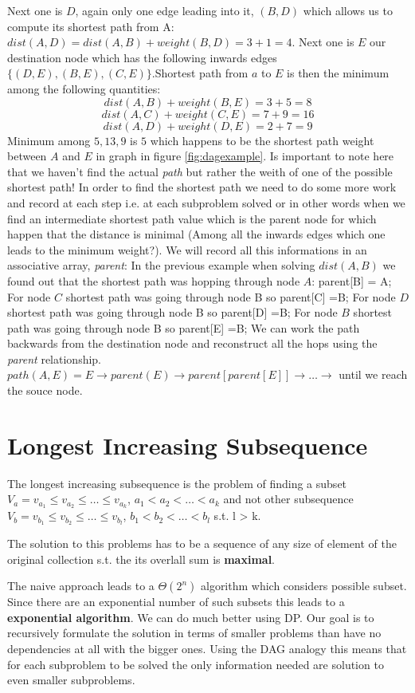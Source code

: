 Next one is $D$, again only one edge leading into it, $(B,D)$ which allows us to compute its shortest path from A: $dist(A,D) = dist(A,B) + weight(B,D) = 3 +1 =4$.
Next one is $E$ our destination node which has the following inwards edges $\{(D,E),(B,E), (C,E)\}$.Shortest path from $a$ to $E$ is then 
the minimum among the following quantities:
\[
	dist(A,B) + weight(B,E) = 3+5=8
\]
\[
	dist(A,C) + weight(C,E) = 7 + 9 = 16
\]
\[
	dist(A,D) + weight(D,E) = 2 +7 =9
\]
Minimum among $5,13,9$ is $5$ which happens to be the shortest path weight between $A$ and $E$ in graph in figure \ref{fig:dagexample}.
Is important to note here that we haven't find the actual \textit{path} but rather the weith of one of the possible shortest path! In order to find the shortest path we need to do some more work and record at each step i.e. at each subproblem solved or in other words when we find an intermediate shortest path value which is the parent node for which happen that the distance is minimal (Among all the inwards edges which one leads to the minimum weight?).
We will record all this informations in an associative array, \textit{parent}:
In the previous example when solving $dist(A,B)$ we found out that the shortest path was hopping through node $A$:  parent[B] = A;
For node $C$ shortest path was going through node B so parent[C] =B;
For node $D$ shortest path was going through node B so parent[D] =B;
For node $B$ shortest path was going through node B so parent[E] =B;
We can work the path backwards from the destination node and reconstruct all the hops using the \textit{parent} relationship.
$path(A,E) = E \rightarrow parent(E) \rightarrow  parent[parent[E]] \rightarrow  \ldots \rightarrow $ until we reach the souce node.

\section{Longest Increasing Subsequence}
The longest increasing subsequence is the problem of finding a subset $V_a=v_{a_1} \leq v_{a_2} \leq\ldots \leq v_{a_k}$, $a_1 < a_2 < \ldots < a_k$ and not other subsequence $V_b=v_{b_1}\leq v_{b_2}\leq \ldots \leq v_{b_l}$, $b_1 < b_2 < \ldots < b_l$ s.t. l > k.

The solution to this problems has to be a sequence of any size of element of the original collection s.t. the its overlall sum is \textbf{maximal}.

The naive approach leads to a $\Theta(2^n)$ algorithm which considers possible subset. Since there are an exponential number of such subsets this leads to a \textbf{exponential algorithm}.
We can do much better using DP.
Our goal is to recursively formulate the solution in terms of smaller problems than have no dependencies at all with the bigger ones.  Using the DAG analogy this means that for each subproblem to be solved the only information needed are solution to even smaller subproblems.

